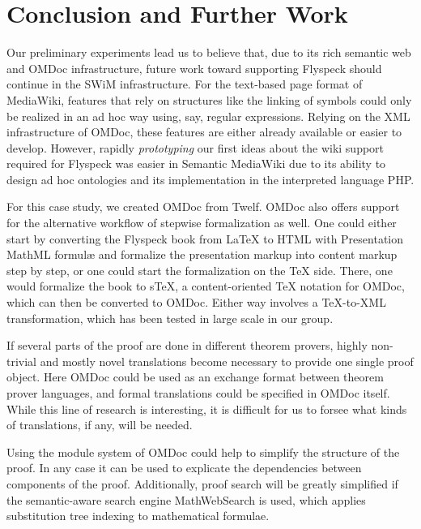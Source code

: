 
\section{Conclusion and Further Work}
\label{sec:conc}

Our preliminary experiments lead us to believe that, due to its rich
semantic web and OMDoc infrastructure, future work toward supporting
Flyspeck should continue in the SWiM infrastructure.  For the text-based
page format of MediaWiki, features that rely on structures like the
linking of symbols could only be realized in an ad hoc way
using, say, regular expressions.  Relying on the XML infrastructure of
OMDoc, these features are either already available or easier to develop.
However, rapidly \emph{prototyping} our first ideas about the wiki
support required for Flyspeck was easier in Semantic MediaWiki due to
its ability to design ad hoc ontologies and its implementation in the
interpreted language PHP.

For this case study, we created OMDoc from Twelf. OMDoc also offers
support for the alternative workflow of stepwise formalization as
well.  One could either start by converting the Flyspeck book from
{\LaTeX} to HTML with Presentation MathML formulæ and formalize the
presentation markup into content markup step by step, or one could
start the formalization on the {\TeX} side.  There, one would
formalize the book to s\TeX{}, a content-oriented {\TeX} notation for
OMDoc, which can then be converted to OMDoc\cite{Kohlhase:albwo06}.
Either way involves a {\TeX}-to-XML transformation, which has been
tested in large scale in our group\cite{URL:arXMLiv}.

If several parts of the proof are done in different theorem provers,
highly non-trivial and mostly novel translations become necessary to
provide one single proof object. Here OMDoc could be used as an
exchange format between theorem prover languages, and formal
translations could be specified in OMDoc itself.  While this line of
research is interesting, it is difficult for us to forsee what kinds
of translations, if any, will be needed.

Using the module system of OMDoc could help to simplify
the structure of the proof. In any case it can be used to explicate
the dependencies between components of the proof. Additionally,
proof search will be greatly simplified if the semantic-aware search engine
MathWebSearch\cite{KohSuc:asemf06} is used, which applies substitution
tree indexing to mathematical formulae.

